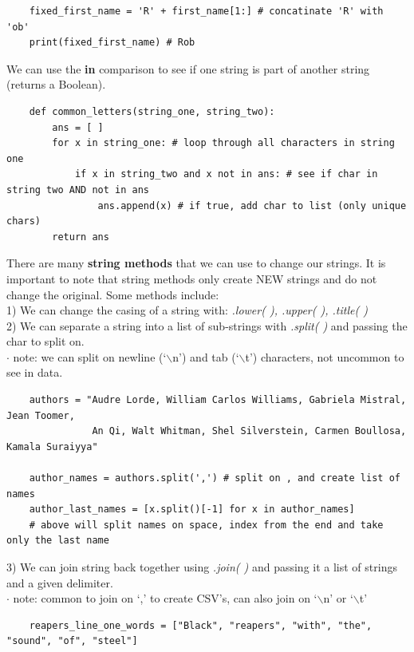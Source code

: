 \documentclass[11pt, a4paper]{article}
\begin{document}
\begin{spacing}{1.1}
\begin{lstlisting}
	fixed_first_name = 'R' + first_name[1:] # concatinate 'R' with 'ob'
	print(fixed_first_name) # Rob \end{lstlisting}\vspace*{1mm}
	We can use the \textbf{in} comparison to see if one string is part of another string (returns a Boolean). 
	\begin{lstlisting}
	def common_letters(string_one, string_two):
		ans = [ ]
		for x in string_one: # loop through all characters in string one
			if x in string_two and x not in ans: # see if char in string two AND not in ans
				ans.append(x) # if true, add char to list (only unique chars)
		return ans \end{lstlisting}\vspace*{1mm}
	There are many \textbf{string methods} that we can use to change our strings. It is important to note that string methods only create NEW strings and do not change the original. Some methods include: \\
	\hspace*{1.5mm} 1) We can change the casing of a string with: \textit{.lower( ), .upper( ), .title( )} \\
	\hspace*{1.5mm} 2) We can separate a string into a list of sub-strings with \textit{.split( )} and passing the char to split on. \\
	\hspace*{6mm} $\cdot$ note: we can split on newline (`$\backslash$n') and tab (`$\backslash$t') characters, not uncommon to see in data.
	\begin{lstlisting}
	authors = "Audre Lorde, William Carlos Williams, Gabriela Mistral, Jean Toomer, 
	           An Qi, Walt Whitman, Shel Silverstein, Carmen Boullosa, Kamala Suraiyya"
	
	author_names = authors.split(',') # split on , and create list of names
	author_last_names = [x.split()[-1] for x in author_names] 
	# above will split names on space, index from the end and take only the last name \end{lstlisting}\vspace*{1mm}
	\hspace*{1.5mm} 3) We can join string back together using \textit{.join( )} and passing it a list of strings and a given delimiter. \\
	\hspace*{6mm} $\cdot$ note: common to join on `,' to create CSV's, can also join on `$\backslash$n' or `$\backslash$t' 
	\begin{lstlisting}
	reapers_line_one_words = ["Black", "reapers", "with", "the", "sound", "of", "steel"]
	

\end{lstlisting}
\end{spacing}
\end{document}
